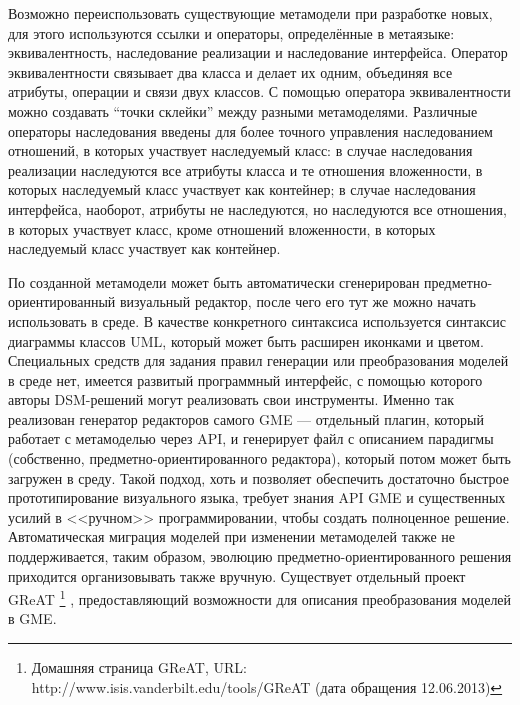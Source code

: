 Возможно переиспользовать существующие метамодели при разработке новых, для этого 
используются ссылки и операторы, определённые в метаязыке: эквивалентность, наследование 
реализации и наследование интерфейса. Оператор эквивалентности связывает два класса 
и делает их одним, объединяя все атрибуты, операции и связи двух классов. С помощью 
оператора эквивалентности можно создавать “точки склейки” между разными метамоделями. 
Различные операторы наследования введены для более точного управления наследованием 
отношений, в которых участвует наследуемый класс: в случае наследования реализации 
наследуются все атрибуты класса и те отношения вложенности, в которых наследуемый 
класс участвует как контейнер; в случае наследования интерфейса, наоборот, атрибуты 
не наследуются, но наследуются все отношения, в которых участвует класс, кроме отношений 
вложенности, в которых наследуемый класс участвует как контейнер.

По созданной метамодели может быть автоматически сгенерирован предметно-ориентированный 
визуальный редактор, после чего его тут же можно начать использовать в среде. В качестве 
конкретного синтаксиса используется синтаксис диаграммы классов UML, который может 
быть расширен иконками и цветом. Специальных средств для задания правил генерации 
или преобразования моделей в среде нет, имеется развитый программный интерфейс, с 
помощью которого авторы \ac{DSM}-решений могут реализовать свои инструменты. Именно так 
реализован генератор редакторов самого GME --- отдельный плагин, который работает с 
метамоделью через API, и генерирует файл с описанием парадигмы (собственно, предметно-ориентированного 
редактора), который потом может быть загружен в среду. Такой подход, хоть и позволяет 
обеспечить достаточно быстрое прототипирование визуального языка, требует знания API GME 
и существенных усилий в <<ручном>> программировании, чтобы создать полноценное решение. 
Автоматическая миграция моделей при изменении метамоделей также не поддерживается, 
таким образом, эволюцию предметно-ориентированного решения приходится организовывать также вручную. Существует отдельный проект GReAT%
\footnote{Домашняя страница GReAT, URL: http://www.isis.vanderbilt.edu/tools/GReAT (дата обращения 12.06.2013)}%
, предоставляющий возможности для описания преобразования моделей в GME.

